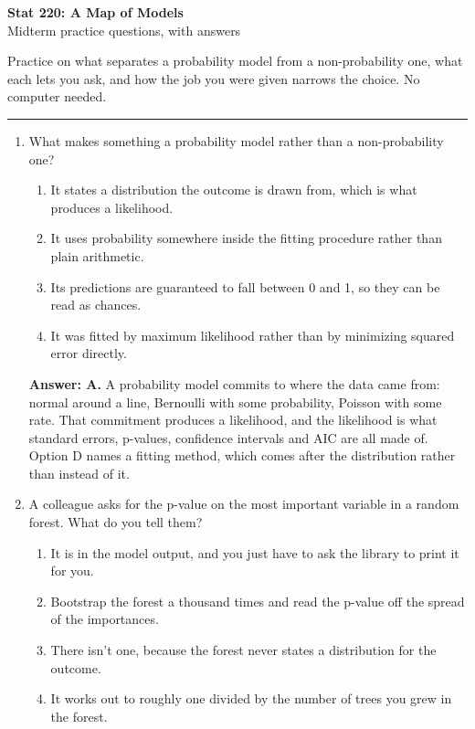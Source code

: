 \documentclass[11pt]{article}
\begin{document}
\begin{center}
{\Large\textbf{Stat 220: A Map of Models}}\\[3pt]
{\large Midterm practice questions, with answers}\\[6pt]
\end{center}

Practice on what separates a probability model from a non-probability one, what each lets you
ask, and how the job you were given narrows the choice. No computer needed.

\vspace{8pt}
\hrule
\vspace{10pt}

\begin{enumerate}[itemsep=14pt]
\item What makes something a probability model rather than a non-probability one?

\begin{enumerate}[label=\Alph*., itemsep=1pt, topsep=3pt]
  \item It states a distribution the outcome is drawn from, which is what produces a likelihood.
  \item It uses probability somewhere inside the fitting procedure rather than plain arithmetic.
  \item Its predictions are guaranteed to fall between 0 and 1, so they can be read as chances.
  \item It was fitted by maximum likelihood rather than by minimizing squared error directly.
\end{enumerate}

\vspace{2pt}
\textbf{Answer: A.} A probability model commits to where the data came from: normal around a line, Bernoulli with some probability, Poisson with some rate. That commitment produces a likelihood, and the likelihood is what standard errors, p-values, confidence intervals and AIC are all made of. Option D names a fitting method, which comes after the distribution rather than instead of it.
\vspace{4pt}

\item A colleague asks for the p-value on the most important variable in a random forest. What do you tell them?

\begin{enumerate}[label=\Alph*., itemsep=1pt, topsep=3pt]
  \item It is in the model output, and you just have to ask the library to print it for you.
  \item Bootstrap the forest a thousand times and read the p-value off the spread of the importances.
  \item There isn't one, because the forest never states a distribution for the outcome.
  \item It works out to roughly one divided by the number of trees you grew in the forest.
\end{enumerate}


\end{enumerate}
\end{document}
